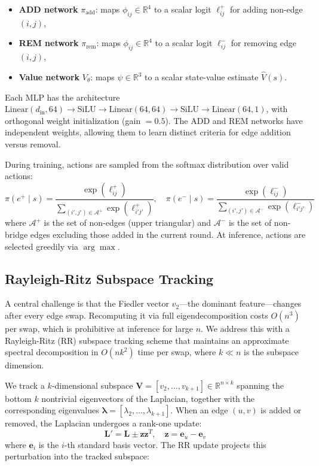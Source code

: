 \documentclass{article}
\begin{document}
\begin{itemize}
    \item \textbf{ADD network} $\pi_{\text{add}}$: maps $\phi_{ij} \in \mathbb{R}^4$ to a scalar logit $\ell_{ij}^+$ for adding non-edge $(i,j)$,
    \item \textbf{REM network} $\pi_{\text{rem}}$: maps $\phi_{ij} \in \mathbb{R}^4$ to a scalar logit $\ell_{ij}^-$ for removing edge $(i,j)$,
    \item \textbf{Value network} $V_\theta$: maps $\psi \in \mathbb{R}^3$ to a scalar state-value estimate $\hat{V}(s)$.
\end{itemize}
Each MLP has the architecture $\text{Linear}(d_{\text{in}}, 64) \to \text{SiLU} \to \text{Linear}(64, 64) \to \text{SiLU} \to \text{Linear}(64, 1)$, with orthogonal weight initialization (gain $= 0.5$). The ADD and REM networks have independent weights, allowing them to learn distinct criteria for edge addition versus removal.

During training, actions are sampled from the softmax distribution over valid actions:
\begin{equation}\label{eq:policy}
    \pi(e^+ \mid s) = \frac{\exp(\ell_{ij}^+)}{\sum_{(i',j') \in \mathcal{A}^+} \exp(\ell_{i'j'}^+)}, \quad
    \pi(e^- \mid s) = \frac{\exp(\ell_{ij}^-)}{\sum_{(i',j') \in \mathcal{A}^-} \exp(\ell_{i'j'}^-)}
\end{equation}
where $\mathcal{A}^+$ is the set of non-edges (upper triangular) and $\mathcal{A}^-$ is the set of non-bridge edges excluding those added in the current round. At inference, actions are selected greedily via $\arg\max$.

\subsection{Rayleigh-Ritz Subspace Tracking}\label{sec:rr}

A central challenge is that the Fiedler vector $v_2$—the dominant feature—changes after every edge swap. Recomputing it via full eigendecomposition costs $O(n^3)$ per swap, which is prohibitive at inference for large $n$. We address this with a Rayleigh-Ritz (RR) subspace tracking scheme that maintains an approximate spectral decomposition in $O(nk^2)$ time per swap, where $k \ll n$ is the subspace dimension.

We track a $k$-dimensional subspace $\mathbf{V} = [v_2, \ldots, v_{k+1}] \in \mathbb{R}^{n \times k}$ spanning the bottom $k$ nontrivial eigenvectors of the Laplacian, together with the corresponding eigenvalues $\boldsymbol{\lambda} = [\lambda_2, \ldots, \lambda_{k+1}]$. When an edge $(u, v)$ is added or removed, the Laplacian undergoes a rank-one update:
\begin{equation}\label{eq:laplacian_update}
    \mathbf{L}' = \mathbf{L} \pm \mathbf{z}\mathbf{z}^T, \quad \mathbf{z} = \mathbf{e}_u - \mathbf{e}_v
\end{equation}
where $\mathbf{e}_i$ is the $i$-th standard basis vector. The RR update projects this perturbation into the tracked subspace:
\end{document}
